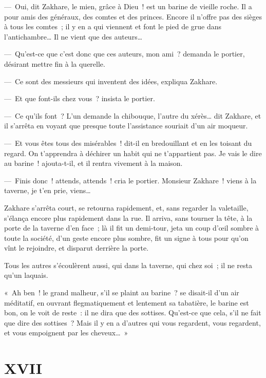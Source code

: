 \documentclass[french,twoside]{book} %
\begin{document}
— Oui, dit Zakhare, le mien, grâce à Dieu ! est un barine de vieille roche. Il a pour amis des généraux, des comtes et des princes. Encore il n’offre pas des sièges à tous les comtes ; il y en a qui viennent et font le pied de grue dans l’antichambre… Il ne vient que des auteurs…\par
— Qu’est-ce que c’est donc que ces auteurs, mon ami ? demanda le portier, désirant mettre fin à la querelle.\par
— Ce sont des messieurs qui inventent des idées, expliqua Zakhare.\par
— Et que font-ils chez vous ? insista le portier.\par
— Ce qu’ils font ? L’un demande la chibouque, l’autre du xérès… dit Zakhare, et il s’arrêta en voyant que presque toute l’assistance souriait d’un air moqueur.\par
— Et vous êtes tous des misérables ! dit-il en bredouillant et en les toisant du regard. On t’apprendra à déchirer un habit qui ne t’appartient pas. Je vais le dire au barine ! ajouta-t-il, et il rentra vivement à la maison.\par
— Finis donc ! attends, attends ! cria le portier. Monsieur Zakhare ! viens à la taverne, je t’en prie, viens…\par
Zakhare s’arrêta court, se retourna rapidement, et, sans regarder la valetaille, s’élança encore plus rapidement dans la rue. Il arriva, sans tourner la tête, à la porte de la taverne d’en face ; là il fit un demi-tour, jeta un coup d’œil sombre à toute la société, d’un geste encore plus sombre, fit un signe à tous pour qu’on vînt le rejoindre, et disparut derrière la porte.\par
Tous les autres s’écoulèrent aussi, qui dans la taverne, qui chez soi ; il ne resta qu’un laquais.\par
« Ah ben ! le grand malheur, s’il se plaint au barine ? se disait-il d’un air méditatif, en ouvrant flegmatiquement et lentement sa tabatière, le barine est bon, on le voit de reste : il ne dira que des sottises. Qu’est-ce que cela, s’il ne fait que dire des sottises ? Mais il y en a d’autres qui vous regardent, vous regardent, et vous empoignent par les cheveux… »
\section[{XVII}]{XVII}\renewcommand{\leftmark}{XVII}
\end{document}
